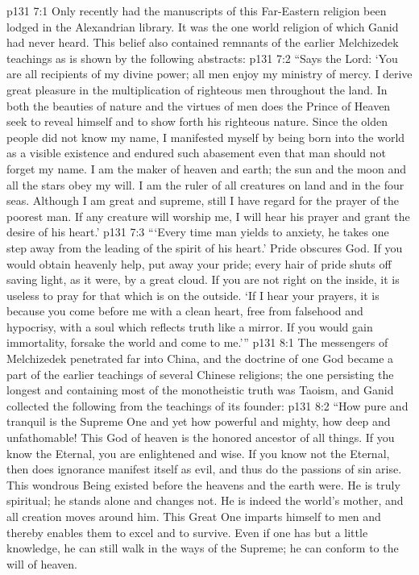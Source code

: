 \vs p131 7:1 Only recently had the manuscripts of this Far\hyp{}Eastern religion been lodged in the Alexandrian library. It was the one world religion of which Ganid had never heard. This belief also contained remnants of the earlier Melchizedek teachings as is shown by the following abstracts:
\pc \vs p131 7:2 “Says the Lord: ‘You are all recipients of my divine power; all men enjoy my ministry of mercy. I derive great pleasure in the multiplication of righteous men throughout the land. In both the beauties of nature and the virtues of men does the Prince of Heaven seek to reveal himself and to show forth his righteous nature. Since the olden people did not know my name, I manifested myself by being born into the world as a visible existence and endured such abasement even that man should not forget my name. I am the maker of heaven and earth; the sun and the moon and all the stars obey my will. I am the ruler of all creatures on land and in the four seas. Although I am great and supreme, still I have regard for the prayer of the poorest man. If any creature will worship me, I will hear his prayer and grant the desire of his heart.’
\vs p131 7:3 “‘Every time man yields to anxiety, he takes one step away from the leading of the spirit of his heart.’ Pride obscures God. If you would obtain heavenly help, put away your pride; every hair of pride shuts off saving light, as it were, by a great cloud. If you are not right on the inside, it is useless to pray for that which is on the outside. ‘If I hear your prayers, it is because you come before me with a clean heart, free from falsehood and hypocrisy, with a soul which reflects truth like a mirror. If you would gain immortality, forsake the world and come to me.’”
\vs p131 8:1 The messengers of Melchizedek penetrated far into China, and the doctrine of one God became a part of the earlier teachings of several Chinese religions; the one persisting the longest and containing most of the monotheistic truth was Taoism, and Ganid collected the following from the teachings of its founder:
\pc \vs p131 8:2 “How pure and tranquil is the Supreme One and yet how powerful and mighty, how deep and unfathomable! This God of heaven is the honored ancestor of all things. If you know the Eternal, you are enlightened and wise. If you know not the Eternal, then does ignorance manifest itself as evil, and thus do the passions of sin arise. This wondrous Being existed before the heavens and the earth were. He is truly spiritual; he stands alone and changes not. He is indeed the world’s mother, and all creation moves around him. This Great One imparts himself to men and thereby enables them to excel and to survive. Even if one has but a little knowledge, he can still walk in the ways of the Supreme; he can conform to the will of heaven.
